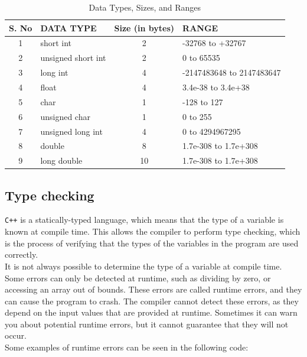 \begin{table}[ht]
    \centering
    \begin{tabular}{|c|l|c|l|}
    \hline
    \textbf{S. No} & \textbf{DATA TYPE} & \textbf{Size (in bytes)} & \textbf{RANGE} \\
    \hline
    1 & short int & 2 & -32768 to +32767 \\
    \hline
    2 & unsigned short int & 2 & 0 to 65535 \\
    \hline
    3 & long int & 4 & -2147483648 to 2147483647 \\
    \hline
    4 & float & 4 & 3.4e-38 to 3.4e+38 \\
    \hline
    5 & char & 1 & -128 to 127 \\
    \hline
    6 & unsigned char & 1 & 0 to 255 \\
    \hline
    7 & unsigned long int & 4 & 0 to 4294967295 \\
    \hline
    8 & double & 8 & 1.7e-308 to 1.7e+308 \\
    \hline
    9 & long double & 10 & 1.7e-308 to 1.7e+308 \\
    \hline
    \end{tabular}
    \caption{Data Types, Sizes, and Ranges}
    \label{tab:data_types}
\end{table}

\subsection{Type checking}

\texttt{C++} is a statically-typed language, which means that the type of a variable is known at compile time.
This allows the compiler to perform type checking, which is the process of verifying that the types of the
variables in the program are used correctly.\\

It is not always possible to determine the type of a variable at compile time. Some errors can only be detected
at runtime, such as dividing by zero, or accessing an array out of bounds. These errors are called runtime errors,
and they can cause the program to crash. The compiler cannot detect these errors, as they depend on the input
values that are provided at runtime. Sometimes it can warn you about potential runtime errors, but it cannot
guarantee that they will not occur.\\

Some examples of runtime errors can be seen in the following code:


